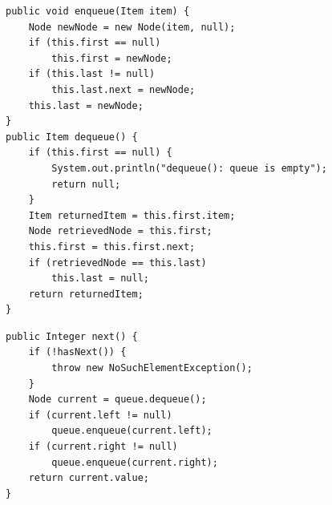 \documentclass[a4paper,11pt]{article}
\newenvironment{code}{\captionsetup{type=listing}}{}
\begin{document}
\begin{code}
    \label{code:queue}
    \begin{verbatim}
public void enqueue(Item item) {
    Node newNode = new Node(item, null);
    if (this.first == null)
        this.first = newNode;
    if (this.last != null)
        this.last.next = newNode;
    this.last = newNode;
}
public Item dequeue() {
    if (this.first == null) {
        System.out.println("dequeue(): queue is empty");
        return null;
    }
    Item returnedItem = this.first.item;
    Node retrievedNode = this.first;
    this.first = this.first.next;
    if (retrievedNode == this.last)
        this.last = null;
    return returnedItem;
}
\end{verbatim}
\end{code}

\begin{code}
    \label{code:iterator}
    \begin{verbatim}
public Integer next() {
    if (!hasNext()) {
        throw new NoSuchElementException();
    }
    Node current = queue.dequeue();
    if (current.left != null)
        queue.enqueue(current.left);
    if (current.right != null)
        queue.enqueue(current.right);
    return current.value;
}
\end{verbatim}
\end{code}

\begin{code}
    \label{code:iterator}
    \begin{verbatim}

\end{verbatim}
\end{code}
\end{document}
